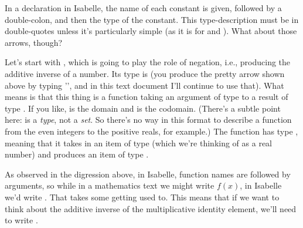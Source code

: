 In a  declaration in Isabelle, the name of each constant is given, followed by a double-colon, and then the type of the constant. This type-description must be in double-quotes unless it's particularly simple (as it is for  and ). What about those arrows, though? 

Let's start with , which is going to play the role of negation, i.e., producing the additive inverse of a number. Its type is   (you produce the pretty arrow shown above by typing '\isi{=>}', and in this text document I'll continue to use that). What  means is that this thing is a function taking an argument of type  to a result of type . If you like,  is the domain and  is the codomain. (There's a subtle point here:  is a \textit{type}, not a \textit{set}. So there's no way in this format to describe a function from the even integers to the positive reals, for example.) The  function has type , meaning that it takes in an item of type  (which we're thinking of as a real number) and produces an item of type .


As observed in the digression above, in Isabelle, function names are followed by arguments, so while in a mathematics text we might write $f(x)$, in Isabelle we'd write . That takes some getting used to. This means that if we want to think about the additive inverse of the multiplicative identity element, we'll need to write .

